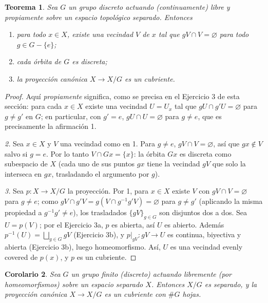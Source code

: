 \documentclass[11pt,a4paper]{article}
\theoremstyle{plain}
\newtheorem{theorem}{Teorema}[section]
\newtheorem{corollary}[theorem]{Corolario}
\theoremstyle{definition}
\theoremstyle{remark}
\begin{document}
\begin{theorem}
\label{thm:accion-propia-cubriente}
Sea $G$ un grupo discreto actuando (continuamente) libre y propiamente
sobre un espacio topológico separado. Entonces
\begin{enumerate}[label=\arabic*.]
\item para todo $x\in X$, existe una vecindad $V$ de $x$ tal que
$gV\cap V=\varnothing$ para todo $g\in G-\{e\}$;
\item cada órbita de $G$ es discreta;
\item la proyección canónica $X\to X/G$ es un cubriente.
\end{enumerate}
\end{theorem}

\begin{proof}
Aquí \emph{propiamente} significa, como se precisa en el Ejercicio 3 de
esta sección: para cada $x\in X$ existe una vecindad $U=U_x$ tal que
$gU\cap g'U=\varnothing$ para $g\ne g'$ en $G$; en particular, con $g'=e$,
$gU\cap U=\varnothing$ para $g\ne e$, que es precisamente la afirmación 1.

\emph{2.} Sea $x\in X$ y $V$ una vecindad como en 1. Para $g\ne e$,
$gV\cap V=\varnothing$, así que $gx\notin V$ salvo si $g=e$. Por lo tanto
$V\cap Gx=\{x\}$: la órbita $Gx$ es discreta como subespacio de $X$
(cada uno de sus puntos $gx$ tiene la vecindad $gV$ que solo la interseca
en $gx$, trasladando el argumento por $g$).

\emph{3.} Sea $p:X\to X/G$ la proyección. Por 1, para $x\in X$ existe $V$
con $gV\cap V=\varnothing$ para $g\ne e$; como $gV\cap g'V=g(V\cap g^{-1}g'V)=\varnothing$
para $g\ne g'$ (aplicando la misma propiedad a $g^{-1}g'\ne e$), los
trasladados $\{gV\}_{g\in G}$ son disjuntos dos a dos. Sea $U=p(V)$; por el
Ejercicio 3a, $p$ es abierta, así $U$ es abierto. Además
$p^{-1}(U)=\bigsqcup_{g\in G}gV$ (Ejercicio 3b), y $p|_{gV}:gV\to U$ es
continua, biyectiva y abierta (Ejercicio 3b), luego homeomorfismo. Así,
$U$ es una vecindad evenly covered de $p(x)$, y $p$ es un cubriente.
\end{proof}

\begin{corollary}
\label{cor:accion-finita-cubriente}
Sea $G$ un grupo finito (discreto) actuando libremente (por homeomorfismos)
sobre un espacio separado $X$. Entonces $X/G$ es separado, y la proyección
canónica $X\to X/G$ es un cubriente con $\#G$ hojas.
\end{corollary}
\end{document}
